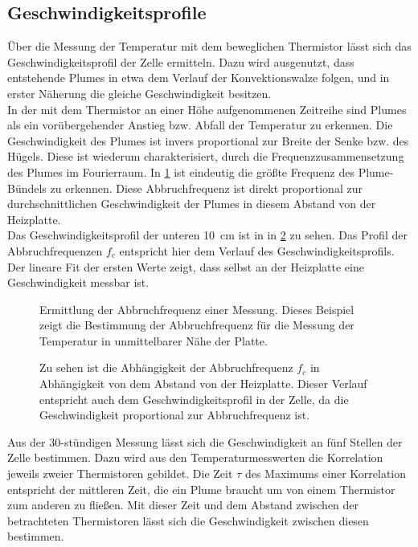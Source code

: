 \subsection{Geschwindigkeitsprofile}
Über die Messung der Temperatur mit dem beweglichen Thermistor lässt sich das Geschwindigkeitsprofil der Zelle ermitteln.
Dazu wird ausgenutzt, dass entstehende Plumes in etwa dem Verlauf der Konvektionswalze folgen, und in erster Näherung die gleiche Geschwindigkeit besitzen.
\\
In der mit dem Thermistor an einer Höhe aufgenommenen Zeitreihe sind Plumes als ein vorübergehender Anstieg bzw. Abfall der Temperatur zu erkennen. 
Die Geschwindigkeit des Plumes ist invers proportional zur Breite der Senke bzw. des Hügels.
Diese ist wiederum charakterisiert, durch die Frequenzzusammensetzung des Plumes im Fourierraum.
In \cref{fig:abbruch} ist eindeutig die größte Frequenz des Plume-Bündels zu erkennen. Diese Abbruchfrequenz ist direkt proportional zur durchschnittlichen Geschwindigkeit der Plumes in diesem Abstand von der Heizplatte.
\\
Das Geschwindigkeitsprofil der unteren \SI{10}{\centi\meter} ist in in \cref{fig:vprof_freq} zu sehen. 
Das Profil der Abbruchfrequenzen $f_c$ entspricht hier dem Verlauf des Geschwindigkeitsprofils.
Der lineare Fit der ersten Werte zeigt, dass selbst an der Heizplatte eine Geschwindigkeit messbar ist.
\\
\begin{figure}
	\caption{Ermittlung der Abbruchfrequenz einer Messung. Dieses Beispiel zeigt die Bestimmung der Abbruchfrequenz für die Messung der Temperatur in unmittelbarer Nähe der Platte. }\label{fig:abbruch}
\end{figure}
\begin{figure}
	\caption{Zu sehen ist die Abhängigkeit der Abbruchfrequenz $f_c$ in Abhängigkeit von dem Abstand von der Heizplatte. Dieser Verlauf entspricht auch dem Geschwindigkeitsprofil in der Zelle, da die Geschwindigkeit proportional zur Abbruchfrequenz ist.}\label{fig:vprof_freq}
\end{figure}
Aus der 30-stündigen Messung lässt sich die Geschwindigkeit an fünf Stellen der Zelle bestimmen. Dazu wird aus den Temperaturmesswerten die Korrelation jeweils zweier Thermistoren gebildet.
Die Zeit $\tau$ des Maximums einer Korrelation entspricht der mittleren Zeit, die ein Plume braucht um von einem Thermistor zum anderen zu fließen.
Mit dieser Zeit und dem Abstand zwischen der betrachteten Thermistoren lässt sich die Geschwindigkeit zwischen diesen bestimmen.
